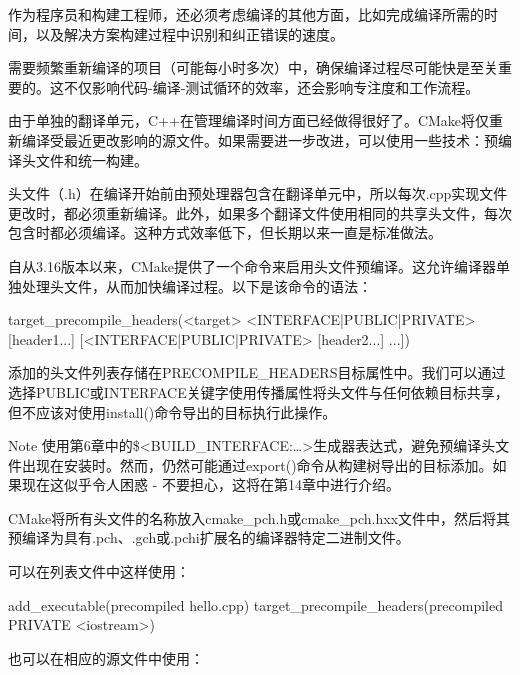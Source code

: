 
作为程序员和构建工程师，还必须考虑编译的其他方面，比如完成编译所需的时间，以及解决方案构建过程中识别和纠正错误的速度。


需要频繁重新编译的项目（可能每小时多次）中，确保编译过程尽可能快是至关重要的。这不仅影响代码-编译-测试循环的效率，还会影响专注度和工作流程。

由于单独的翻译单元，C++在管理编译时间方面已经做得很好了。CMake将仅重新编译受最近更改影响的源文件。如果需要进一步改进，可以使用一些技术：预编译头文件和统一构建。


头文件（.h）在编译开始前由预处理器包含在翻译单元中，所以每次.cpp实现文件更改时，都必须重新编译。此外，如果多个翻译文件使用相同的共享头文件，每次包含时都必须编译。这种方式效率低下，但长期以来一直是标准做法。

自从3.16版本以来，CMake提供了一个命令来启用头文件预编译。这允许编译器单独处理头文件，从而加快编译过程。以下是该命令的语法：

\begin{shell}
target_precompile_headers(<target>
                          <INTERFACE|PUBLIC|PRIVATE> [header1...]
                         [<INTERFACE|PUBLIC|PRIVATE> [header2...]
...])
\end{shell}

添加的头文件列表存储在PRECOMPILE\_HEADERS目标属性中。我们可以通过选择PUBLIC或INTERFACE关键字使用传播属性将头文件与任何依赖目标共享，但不应该对使用install()命令导出的目标执行此操作。

\begin{myNotic}{Note}
使用第6章中的\$<BUILD\_INTERFACE:…>生成器表达式，避免预编译头文件出现在安装时。然而，仍然可能通过export()命令从构建树导出的目标添加。如果现在这似乎令人困惑 - 不要担心，这将在第14章中进行介绍。
\end{myNotic}

CMake将所有头文件的名称放入cmake\_pch.h或cmake\_pch.hxx文件中，然后将其预编译为具有.pch、.gch或.pchi扩展名的编译器特定二进制文件。

可以在列表文件中这样使用：


\begin{cmake}
add_executable(precompiled hello.cpp)
target_precompile_headers(precompiled PRIVATE <iostream>)
\end{cmake}

也可以在相应的源文件中使用：

